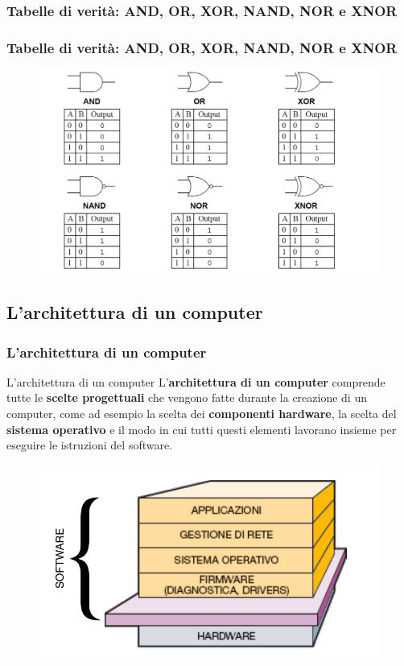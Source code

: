 \subsubsection[Tabelle di verità: AND, OR, XOR, NAND, NOR e XNOR]{Tabelle di verità: AND, OR, XOR, NAND, NOR e XNOR}
\begin{frame}
	\frametitle{Tabelle di verità: AND, OR, XOR, NAND, NOR e XNOR}

	\begin{figure}[!htbp]
		\centering 
		\includegraphics[width=1.0\linewidth]{images/2_le_architetture/logic_gates_truthtables.png}
	\end{figure}
	
\end{frame}



\subsection[L'architettura di un computer]{L'architettura di un computer}
\begin{frame}
	\frametitle{L'architettura di un computer}
	
	\begin{block}{L'architettura di un computer}
		L'\textbf{architettura di un computer} comprende tutte le \textbf{scelte progettuali} che vengono fatte durante la creazione di un computer, come ad esempio la scelta dei \textbf{componenti hardware}, la scelta del \textbf{sistema operativo} e il modo in cui tutti questi elementi lavorano insieme per eseguire le istruzioni del software.
	\end{block}
	
	\begin{figure}[!htbp]
		\centering 
		\includegraphics[width=0.6\linewidth]{images/2_le_architetture/hd-sw.pdf}
	\end{figure}
	
\end{frame}


